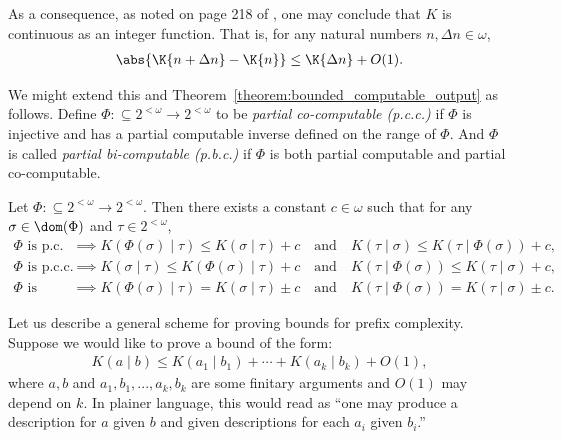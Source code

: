 As a consequence, as noted on page 218 of \cite{LV08}, one may conclude that $K$ is continuous as an integer function. That is, for any natural numbers $n, \Delta n \in \omega$,
\begin{align*}
    \abs{\K{n + \Delta n} - \K{n}} \leq \K{\Delta n} + O(1).
\end{align*}

We might extend this and Theorem~\ref{theorem:bounded_computable_output} as follows. Define $\Phi : \subseteq 2^{<\omega} \to 2^{<\omega}$ to be \textit{partial co-computable (p.c.c.)}  if $\Phi$ is injective and has a partial computable inverse defined on the range of $\Phi$. And $\Phi$ is called \textit{partial bi-computable (p.b.c.)} if $\Phi$ is both partial computable and partial co-computable. 

\begin{proposition}
    \label{proposition:bi_computable_K}
    Let $\Phi : \subseteq 2^{<\omega} \to 2^{<\omega}$. Then there exists a constant $c \in \omega$ such that for any $\sigma \in \dom(\Phi)$ and $\tau \in 2^{<\omega}$,
    \begin{align*}
        \Phi \text{ is p.c.} &\implies K(\Phi(\sigma) \mid \tau) \leq K(\sigma \mid \tau) + c \quad \text{and} \quad K(\tau \mid \sigma) \leq K(\tau \mid \Phi(\sigma)) + c,\\
        \Phi \text{ is p.c.c.} &\implies K(\sigma \mid \tau) \leq K(\Phi(\sigma) \mid \tau) + c \quad \text{and} \quad K(\tau \mid \Phi(\sigma)) \leq K(\tau \mid \sigma) + c,\\
        \Phi \text{ is p.b.c.} &\implies K(\Phi(\sigma) \mid \tau) = K(\sigma \mid \tau) \pm c \quad \text{and} \quad K(\tau \mid \Phi(\sigma)) = K(\tau \mid \sigma) \pm c.
    \end{align*}
\end{proposition}

Let us describe a general scheme for proving bounds for prefix complexity. Suppose we would like to prove a bound of the form:
\begin{align*}
    K(a \mid b) \leq K(a_1 \mid b_1) + \cdots + K(a_k \mid b_k) + O(1),
\end{align*}
where $a, b$ and $a_1, b_1, ..., a_k, b_k$ are some finitary arguments and $O(1)$ may depend on $k$. In plainer language, this would read as ``one may produce a description for $a$ given $b$ and given descriptions for each $a_i$ given $b_i$.'' 

